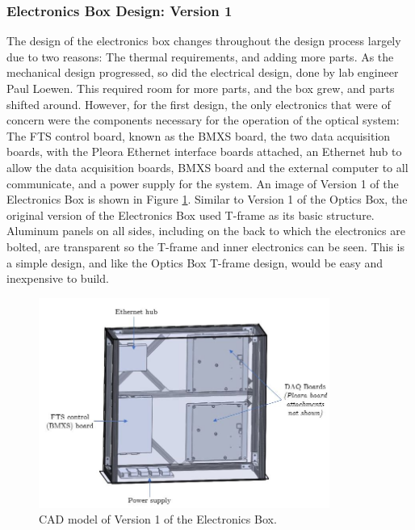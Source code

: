 \subsubsection{Electronics Box Design: Version 1}
The design of the electronics box changes throughout the design process largely due to two reasons: The thermal requirements, and adding more parts. As the mechanical design progressed, so did the electrical design, done by lab engineer Paul Loewen. This required room for more parts, and the box grew, and parts shifted around. However, for the first design, the only electronics that were of concern were the components necessary for the operation of the optical system: The FTS control board, known as the BMXS board, the two data acquisition boards, with the Pleora Ethernet interface boards attached, an Ethernet hub to allow the data acquisition boards, BMXS board and the external computer to all communicate, and a power supply for the system. An image of Version 1 of the Electronics Box is shown in Figure \ref{fig:Ebox_V1}. Similar to Version 1 of the Optics Box, the original version of the Electronics Box used T-frame as its basic structure. Aluminum panels on all sides, including on the back to which the electronics are bolted, are transparent so the T-frame and inner electronics can be seen. This is a simple design, and like the Optics Box T-frame design, would be easy and inexpensive to build.

\begin{figure}
    \centering
    \includegraphics[width=0.85\textwidth]{chap3_images/LIFE_V1_images/Ebox_V1_labelled.JPG}
    \caption{CAD model of Version 1 of the Electronics Box.}
    \label{fig:Ebox_V1}
\end{figure}


